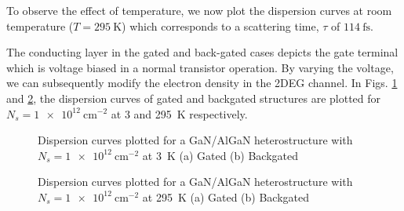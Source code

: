 To observe the effect of temperature, we now plot the dispersion curves at room temperature ($T = \SI{295}{\kelvin}$) which corresponds to a scattering time, $\tau$ of $\SI{114}{\fs}$.
\begin{sidewaysfigure}
  \centering
  \caption{Dispersion Curves plotted for a GaN/AlGaN heterostructure with $N_s = \SI{5e13}{\cm^{-2}}$ at \SI{295}{\kelvin} (a) Gated (b) Backgated (c) Ungated}
  \label{fig:dispersion_hif_hiT}
\end{sidewaysfigure}
%

The conducting layer in the gated and back-gated cases depicts the gate terminal which is voltage biased in a normal transistor operation. By varying the voltage, we can subsequently modify the electron density in the 2DEG channel. In Figs. \ref{fig:dispersion_lof_lowT} and \ref{fig:dispersion_lof_hiT}, the dispersion curves of gated and backgated structures are plotted for $N_s = \SI{1e12}{\cm^{-2}}$ at \SI{3}{} and \SI{295}{\kelvin} respectively.
\begin{figure}[!htbp]
  \begin{center}
  \caption{Dispersion curves plotted for a GaN/AlGaN heterostructure with $N_s = \SI{1e12}{\cm^{-2}}$ at \SI{3}{\kelvin} (a) Gated (b) Backgated}
  \label{fig:dispersion_lof_lowT}
  \end{center}
\end{figure}
%

\begin{figure}[!htbp]
  \begin{center}
  \caption{Dispersion curves plotted for a GaN/AlGaN heterostructure with $N_s = \SI{1e12}{\cm^{-2}}$ at \SI{295}{\kelvin} (a) Gated (b) Backgated}
  \label{fig:dispersion_lof_hiT}
  \end{center}
\end{figure}

